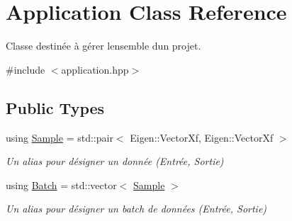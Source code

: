 \hypertarget{classApplication}{}\section{Application Class Reference}
\label{classApplication}


Classe destinée à gérer l\textquotesingle{}ensemble d\textquotesingle{}un projet.  




{\ttfamily \#include $<$application.\+hpp$>$}

\subsection*{Public Types}
\begin{DoxyCompactItemize}
\item 
\mbox{\label{classApplication_add64c430fa6318ac4885ea5ddedf0780}} 
using \hyperlink{classApplication_add64c430fa6318ac4885ea5ddedf0780}{Sample} = std\+::pair$<$ Eigen\+::\+Vector\+Xf, Eigen\+::\+Vector\+Xf $>$
\begin{DoxyCompactList}\small\item\em Un alias pour désigner un donnée (Entrée, Sortie) \end{DoxyCompactList}\item 
\mbox{\label{classApplication_a9888f02149ca3b8ffa499ee07426cd1d}} 
using \hyperlink{classApplication_a9888f02149ca3b8ffa499ee07426cd1d}{Batch} = std\+::vector$<$ \hyperlink{classApplication_add64c430fa6318ac4885ea5ddedf0780}{Sample} $>$
\begin{DoxyCompactList}\small\item\em Un alias pour désigner un batch de données (Entrée, Sortie) \end{DoxyCompactList}\end{DoxyCompactItemize}
